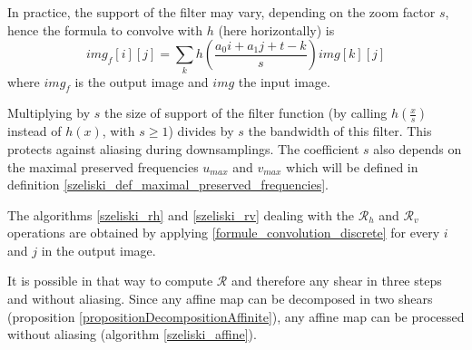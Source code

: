 \noindent	In practice, the support of the filter may vary, depending on the zoom factor $s$, hence the formula to convolve with $h$ (here horizontally) is 
	\begin{equation}
	img_f[i][j] = \displaystyle{\sum_k}h\left(\frac{a_0i+a_1j+t-k}{s}\right)img[k][j]
	\label{formule_convolution_discrete}
	\end{equation}
	where $img_f$ is the output image and $img$ the input image.
	
	
	
	
\noindent	Multiplying by $s$ the size of support of the filter function (by calling $h(\frac{x}{s})$ instead of $h(x)$, with $s\geq 1$) divides by $s$ the bandwidth of this filter. This protects against aliasing during downsamplings. The coefficient $s$ also depends on the maximal preserved frequencies $u_{max}$ and $v_{max}$ which will be defined in definition \ref{szeliski_def_maximal_preserved_frequencies}.
	
	
	The algorithms \ref{szeliski_rh} and \ref{szeliski_rv} dealing with the $\mathcal R_h$ and $\mathcal R_v$ operations are obtained by applying \eqref{formule_convolution_discrete} for every $i$ and $j$ in the output image. \label{szeliski_rv_rh_section}
	
	
	\noindent It is possible in that way to compute $\mathcal R$ and therefore any shear  in three steps and without aliasing. Since any affine map can be decomposed in two shears (proposition \ref{propositionDecompositionAffinite}), any affine map can be processed without aliasing (algorithm \ref{szeliski_affine}).
	
